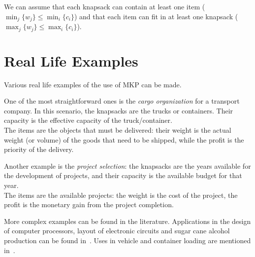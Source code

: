 We can assume that each knapsack can contain at least one item
(\(\min_{j}\{w_{j}\} \leq \min_{i}\{c_{i}\}\))
and that each item can fit in at least one knapsack
(\(\max_{j}\{w_{j}\} \leq \max_{i}\{c_{i}\}\)).


\section{Real Life Examples}
Various real life examples of the use of MKP can be made.

One of the most straightforward ones is the \textit{cargo organization} for a transport company.
In this scenario, the knapsacks are the trucks or containers.
Their capacity is the effective capacity of the truck/container.\\
The items are the objects that must be delivered:
their weight is the actual weight (or volume) of the goods that need to be shipped,
while the profit is the priority of the delivery.

Another example is the \textit{project selection}: the knapsacks are
the years available for the development of projects,
and their capacity is the available budget for that year.\\
The items are the available projects: the weight is the cost of the project,
the profit is the monetary gain from the project completion.

More complex examples can be found in the literature.
Applications in the design of computer processors, layout of electronic
circuits and sugar cane alcohol production can be found in~\cite{example:1996}.
Uses in vehicle and container loading are mentioned in~\cite{example:1971}.